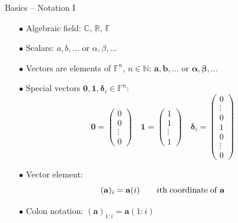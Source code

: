 \documentclass{beamer}
\newcommand{\bgk}[1]{\boldsymbol{#1}}
\newcommand{\bzero}{\bgk{0}}
\newcommand{\bone}{\bgk{1}}
\newcommand{\balpha}{\bgk{\alpha}}
\newcommand{\bbeta}{\bgk{\beta}}
\newcommand{\bdelta}{\bgk{\delta}}
\newcommand{\bvec}[1]{\mathbf{#1}}
\newcommand{\va}{\bvec{a}}
\newcommand{\vb}{\bvec{b}}
\begin{document}
\begin{frame}{Basics -- Notation I}

\begin{itemize}
    \item[$\bullet$] Algebraic field: 
    $\mathbb{C}$, $\mathbb{R}$, $\mathbb{F}$
    \item[$\bullet$] Scalars: 
    $a,b, ...$ or $\alpha, \beta, ...$
    \item[$\bullet$] Vectors are elements of $\mathbb{F}^n$, $n\in\mathbb{N}$:
    $\va, \vb, ...$ or $\balpha, \bbeta, ...$ 
    \item[$\bullet$] Special vectors $\bzero, \bone, \bdelta_i \in \mathbb{F}^n$:
    $$
    \bzero = \begin{pmatrix} 0\\ 0 \\ \vdots \\ 0 \end{pmatrix}
    \quad
    \bone = \begin{pmatrix} 1\\ 1 \\ \vdots \\ 1 \end{pmatrix}
    \quad
    \bdelta_i = \begin{pmatrix} 0\\ \vdots \\ 0 \\ 1\\ 0 \\ \vdots \\ 0 \end{pmatrix}
    $$
    \item[$\bullet$] Vector element:
    $$
    (\va)_{i} = \va({i}) \qquad i\rm{th\;coordinate\;of\; \va}  
    $$
    \item[$\bullet$] Colon notation: $(\va)_{1:i} = \va(1:i)$
\end{itemize}
\end{frame}
\end{document}
